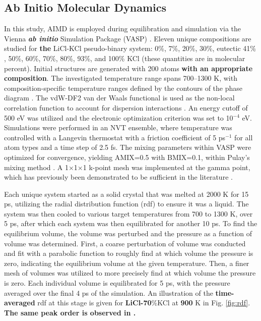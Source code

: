 \documentclass[review]{elsarticle}
\providecommand{\DIFaddtex}[1]{{\bf #1}} %
\providecommand{\DIFdeltex}[1]{} %
\providecommand{\DIFaddbegin}{\protect\color{blue}} %
\providecommand{\DIFaddend}{\protect\color{black}} %
\providecommand{\DIFdelbegin}{\protect\color{red}} %
\providecommand{\DIFdelend}{\protect\color{black}} %
\providecommand{\DIFadd}[1]{\texorpdfstring{\DIFaddtex{#1}}{#1}} %
\providecommand{\DIFdel}[1]{\texorpdfstring{\DIFdeltex{#1}}{}} %
\newcommand{\DIFscaledelfig}{0.5}
\newlength{\DIFdelgraphicswidth} %
\newlength{\DIFdelgraphicsheight} %
\newcommand{\DIFaddincludegraphics}[2][]{{\color{blue}\fbox{\DIFOincludegraphics[#1]{#2}}}} %
\newcommand{\DIFdelincludegraphics}[2][]{%
\sbox{\DIFdelgraphicsbox}{\DIFOincludegraphics[#1]{#2}}%
\settoboxwidth{\DIFdelgraphicswidth}{\DIFdelgraphicsbox} %
\settoboxtotalheight{\DIFdelgraphicsheight}{\DIFdelgraphicsbox} %
\scalebox{\DIFscaledelfig}{%
\parbox[b]{\DIFdelgraphicswidth}{\usebox{\DIFdelgraphicsbox}\\[-\baselineskip] \rule{\DIFdelgraphicswidth}{0em}}\llap{\resizebox{\DIFdelgraphicswidth}{\DIFdelgraphicsheight}{%
\setlength{\unitlength}{\DIFdelgraphicswidth}%
\begin{picture}(1,1)%
\thicklines\linethickness{2pt} %
{\color[rgb]{1,0,0}\put(0,0){\framebox(1,1){}}}%
{\color[rgb]{1,0,0}\put(0,0){\line( 1,1){1}}}%
{\color[rgb]{1,0,0}\put(0,1){\line(1,-1){1}}}%
\end{picture}%
}\hspace*{3pt}}} %
} %
\DeclareRobustCommand{\DIFaddbegin}{\DIFOaddbegin \let\includegraphics\DIFaddincludegraphics} %
\DeclareRobustCommand{\DIFaddend}{\DIFOaddend \let\includegraphics\DIFOincludegraphics} %
\DeclareRobustCommand{\DIFdelbegin}{\DIFOdelbegin \let\includegraphics\DIFdelincludegraphics} %
\DeclareRobustCommand{\DIFdelend}{\DIFOaddend \let\includegraphics\DIFOincludegraphics} %
\begin{document}
\subsection{Ab Initio Molecular Dynamics}
In this study, AIMD is employed during equilibration and simulation via the Vienna \DIFdelbegin \DIFdel{ab initio }\DIFdelend \DIFaddbegin \DIFadd{\textit{ab initio} }\DIFaddend Simulation Package (VASP) \cite{Kresse1993,Kresse1996,Kresse1996a}. Eleven unique compositions are studied for \DIFaddbegin \DIFadd{the }\DIFaddend LiCl-KCl pseudo-binary system: 0\%, 7\%, 20\%, 30\%,  eutectic 41\% \cite{Zhou2017}, 50\%, 60\%, 70\%, 80\%, 93\%, and 100\% KCl (these quantities are in molecular percent\DIFdelbegin \DIFdel{, not weight percent}\DIFdelend ). Initial structures are generated with 200 atoms \DIFaddbegin \DIFadd{with an appropriate composition}\DIFaddend . The investigated temperature range spans 700–1300 K, with composition-specific temperature ranges defined by the contours of the phase diagram \cite{Zhou2017}.  The vdW-DF2 van der Waals functional is used as the non-local correlation function to account for dispersion interactions \cite{Dion2004}. An energy cutoff of 500 eV was utilized and the electronic optimization criterion was set to 10$^{-4}$ eV. Simulations were performed in an NVT ensemble, where temperature was controlled with a Langevin thermostat with a friction coefficient of 5 ps$^{-1}$ for all atom types and a time step of 2.5 fs. The mixing parameters within VASP were optimized for convergence, yielding AMIX=0.5 with BMIX=0.1, within Pulay’s mixing method \cite{PULAY1980393}. A 1$\times$1$\times$1 k-point mesh was implemented at the gamma point, which has previously been demonstrated to be sufficient in the literature \cite{Bengston2014,Song2017}.

Each unique system started as a solid crystal that was melted at 2000 K for 15 ps, utilizing the radial distribution function (rdf) to ensure it was a liquid. The system was then cooled to various target temperatures from 700 to 1300 K, over 5 ps, after which each system was then equilibrated for another 10 ps. To find the equilibrium volume, the volume was perturbed and the pressure as a function of volume was determined. First, a coarse perturbation of volume was conducted and fit with a parabolic function to roughly find at which volume the pressure is zero, indicating the equilibrium volume at the given temperature. Then, a finer mesh of volumes was utilized to more precisely find at which volume the pressure is zero. Each individual volume is equilibrated for 5 ps, with the pressure averaged over the final 4 ps of the simulation. An illustration of the \DIFaddbegin \DIFadd{time-averaged }\DIFaddend rdf at this stage is given for \DIFdelbegin \DIFdel{LiCl-30}\DIFdelend \DIFaddbegin \DIFadd{LiCl-70}\DIFaddend \%KCl at \DIFdelbegin \DIFdel{1300 }\DIFdelend \DIFaddbegin \DIFadd{900 }\DIFaddend K in Fig. \ref{fig:rdf}. \DIFaddbegin \DIFadd{The same peak order is observed in \cite{Bengston2014,WANG2019}.
}\DIFaddend 
\end{document}
